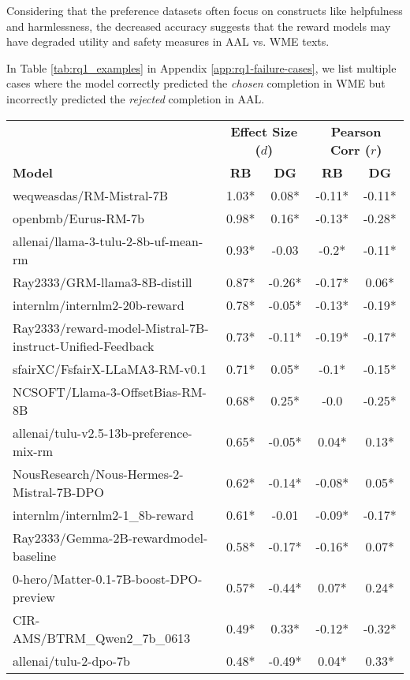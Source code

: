 Considering that the preference datasets often focus on constructs like helpfulness and harmlessness, the decreased accuracy suggests that the reward models may have degraded utility and safety measures in AAL vs. WME texts.

In Table \ref{tab:rq1_examples} in Appendix \ref{app:rq1-failure-cases}, we list multiple cases where the model correctly predicted the \textit{chosen} completion in WME but incorrectly predicted the \textit{rejected} completion in AAL. 

\begin{table*}[htp]
\centering
\small
\begin{tabular}{lcc|cc}
\toprule
 & \multicolumn{2}{c}{\textbf{Effect Size ($d$)}} & \multicolumn{2}{c}{\textbf{Pearson Corr ($r$)}} \\
\cmidrule(lr){2-3} \cmidrule(lr){4-5}
\textbf{Model} & \textbf{RB} & \textbf{DG} & \textbf{RB} & \textbf{DG} \\
\midrule
weqweasdas/RM-Mistral-7B & 1.03* & 0.08* & -0.11* & -0.11* \\
openbmb/Eurus-RM-7b & 0.98* & 0.16* & -0.13* & -0.28* \\
allenai/llama-3-tulu-2-8b-uf-mean-rm & 0.93* & -0.03 & -0.2* & -0.11* \\
Ray2333/GRM-llama3-8B-distill & 0.87* & -0.26* & -0.17* & 0.06* \\
internlm/internlm2-20b-reward & 0.78* & -0.05* & -0.13* & -0.19* \\
Ray2333/reward-model-Mistral-7B-instruct-Unified-Feedback & 0.73* & -0.11* & -0.19* & -0.17* \\
sfairXC/FsfairX-LLaMA3-RM-v0.1 & 0.71* & 0.05* & -0.1* & -0.15* \\
NCSOFT/Llama-3-OffsetBias-RM-8B & 0.68* & 0.25* & -0.0 & -0.25* \\
allenai/tulu-v2.5-13b-preference-mix-rm & 0.65* & -0.05* & 0.04* & 0.13* \\
NousResearch/Nous-Hermes-2-Mistral-7B-DPO & 0.62* & -0.14* & -0.08* & 0.05* \\
internlm/internlm2-1\_8b-reward & 0.61* & -0.01 & -0.09* & -0.17* \\
Ray2333/Gemma-2B-rewardmodel-baseline & 0.58* & -0.17* & -0.16* & 0.07* \\
0-hero/Matter-0.1-7B-boost-DPO-preview & 0.57* & -0.44* & 0.07* & 0.24* \\
CIR-AMS/BTRM\_Qwen2\_7b\_0613 & 0.49* & 0.33* & -0.12* & -0.32* \\
allenai/tulu-2-dpo-7b & 0.48* & -0.49* & 0.04* & 0.33* \\

\end{tabular}
\end{table*}
